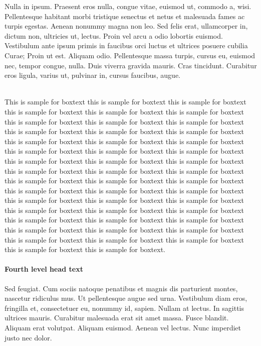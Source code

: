 \documentclass[AMS,STIX2COL]{WileyNJD-v2}
\begin{document}
    Nulla in ipsum. Praesent eros nulla, congue vitae, euismod ut, commodo a, wisi. Pellentesque habitant morbi
    tristique senectus et netus et malesuada fames ac turpis egestas. Aenean nonummy magna non leo. Sed felis erat,
    ullamcorper in, dictum non, ultricies ut, lectus. Proin vel arcu a odio lobortis euismod. Vestibulum ante ipsum primis
    in faucibus orci luctus et ultrices posuere cubilia Curae; Proin ut est. Aliquam odio. Pellentesque massa turpis, cursus
    eu, euismod nec, tempor congue, nulla. Duis viverra gravida mauris. Cras tincidunt. Curabitur eros ligula, varius ut,
    pulvinar in, cursus faucibus, augue.



    \begin{boxtext}
        \\
        This is sample for boxtext this is sample for boxtext this is sample for boxtext this is sample for boxtext this is sample for boxtext this is sample for boxtext this is sample for boxtext this is sample for boxtext this is sample for boxtext this is sample for boxtext this is sample for boxtext this is sample for boxtext this is sample for boxtext this is sample for boxtext this is sample for boxtext this is sample for boxtext this is sample for boxtext this is sample for boxtext this is sample for boxtext this is sample for boxtext this is sample for boxtext this is sample for boxtext this is sample for boxtext this is sample for boxtext this is sample for boxtext this is sample for boxtext this is sample for boxtext this is sample for boxtext this is sample for boxtext this is sample for boxtext this is sample for boxtext this is sample for boxtext this is sample for boxtext this is sample for boxtext this is sample for boxtext this is sample for boxtext this is sample for boxtext this is sample for boxtext this is sample for boxtext this is sample for boxtext this is sample for boxtext this is sample for boxtext this is sample for boxtext this is sample for boxtext this is sample for boxtext this is sample for boxtext this is sample for boxtext.
    \end{boxtext}

    \paragraph{Fourth level head text}

    Sed feugiat. Cum sociis natoque penatibus et magnis dis parturient montes, nascetur ridiculus mus. Ut pellentesque
    augue sed urna. Vestibulum diam eros, fringilla et, consectetuer eu, nonummy id, sapien. Nullam at lectus. In sagittis
    ultrices mauris. Curabitur malesuada erat sit amet massa. Fusce blandit. Aliquam erat volutpat. Aliquam euismod.
    Aenean vel lectus. Nunc imperdiet justo nec dolor.
\end{document}
